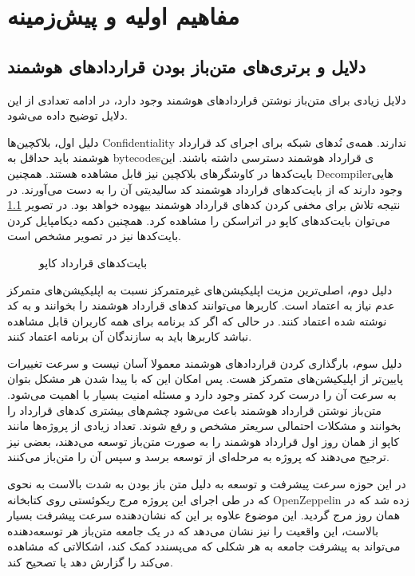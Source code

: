 \chapter{مفاهیم اولیه و پیش‌زمینه}
\section{دلایل و برتری‌های متن‌باز بودن قرارداد‌های هوشمند}
دلایل زیادی برای متن‌باز نوشتن قراردادهای هوشمند وجود دارد، در ادامه تعدادی از این دلایل توضیح داده می‌شود.

دلیل اول، بلاکچین‌ها
\gls{Confidentiality}
ندارند.
همه‌ی نُد‌های شبکه برای اجرای کد قرارداد هوشمند باید حداقل به
\glspl{bytecode}ی
قرارداد هوشمند دسترسی داشته باشند. این بایت‌کد‌ها در کاوشگرهای بلاکچین نیز قابل مشاهده هستند.
همچنین
\gls{Decompiler}هایی
وجود دارند که از بایت‌کد‌های قرارداد هوشمند کد سالیدیتی آن را به دست می‌آورند.
در نتیجه تلاش برای مخفی کردن کدهای قرارداد هوشمند بیهوده خواهد بود.
در تصویر
\ref{fig:cappu-bytecodes}
می‌توان بایت‌کدهای کاپو در اتراسکن را مشاهده کرد.
همچنین دکمه دیکامپایل کردن بایت‌کد‌ها نیز در تصویر مشخص است.

\begin{figure}[H]
\centerline{}
\caption{بایت‌کدهای قرارداد کاپو}
\label{fig:cappu-bytecodes}
\end{figure}

دلیل دوم، اصلی‌ترین مزیت اپلیکیشن‌های غیرمتمرکز نسبت به اپلیکیشن‌های متمرکز عدم نیاز به اعتماد است.
کاربرها می‌توانند کد‌های قرارداد هوشمند را بخوانند و به کد نوشته شده اعتماد کنند.‌
در حالی که اگر کد برنامه برای همه کاربران قابل مشاهده نباشد کاربرها باید به سازندگان آن برنامه اعتماد کنند.

دلیل سوم، بارگذاری کردن قرارداد‌های هوشمند معمولا آسان نیست
و سرعت تغییرات پایین‌تر از اپلیکیشن‌های متمرکز هست.‌
پس امکان این که با پیدا شدن هر مشکل بتوان به سرعت آن را درست کرد کمتر وجود دارد
و مسئله امنیت بسیار با اهمیت می‌شود.
متن‌باز نوشتن قرارداد هوشمند باعث می‌شود چشم‌های بیشتری کدهای قرارداد را بخوانند
و مشکلات احتمالی سریعتر مشخص و رفع شوند.
تعداد زیادی از پروژه‌ها مانند کاپو از همان روز اول قرارداد هوشمند را به صورت متن‌باز توسعه می‌دهند،
بعضی نیز ترجیح می‌دهند که پروژه به مرحله‌ای از توسعه برسد و سپس آن را متن‌باز می‌کنند.

در این حوزه سرعت پیشرفت و توسعه به دلیل متن باز بودن به شدت بالاست
به نحوی که در طی اجرای این پروژه مرج ریکوئستی روی کتابخانه
\gls{OpenZeppelin}
زده شد که در همان روز مرج گردید.
این موضوع علاوه بر این که نشان‌دهنده سرعت پیشرفت بسیار بالاست،
این واقعیت را نیز نشان می‌دهد که در یک جامعه متن‌باز هر توسعه‌دهنده
می‌تواند به پیشرفت جامعه به هر شکلی که می‌پسندد کمک کند،
اشکالاتی که مشاهده می‌کند را گزارش دهد یا تصحیح کند.

